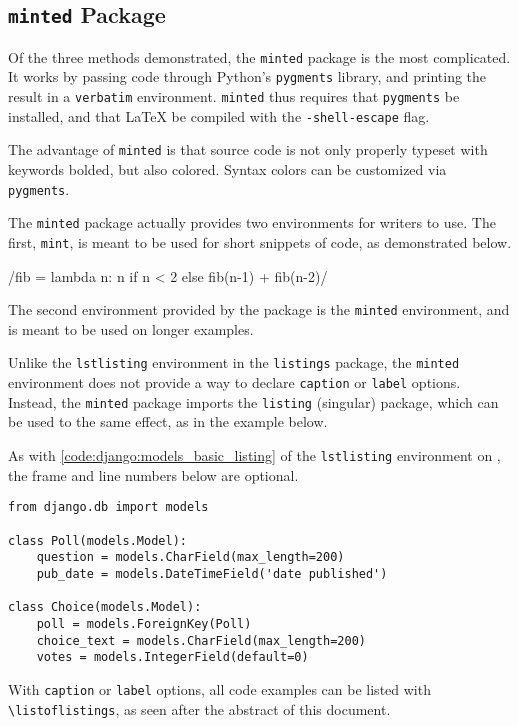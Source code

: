 
\subsection{\texttt{minted} Package}

Of the three methods demonstrated, the \verb|minted| package is the most complicated. It works by passing code through Python's \verb|pygments| library, and printing the result in a \verb|verbatim| environment. \verb|minted| thus requires that \verb|pygments| be installed, and that \LaTeX{} be compiled with the \verb|-shell-escape| flag.

The advantage of \verb|minted| is that source code is not only properly typeset with keywords bolded, but also colored. Syntax colors can be customized via \verb|pygments|.

The \verb|minted| package actually provides two environments for writers to use. The first, \verb|mint|, is meant to be used for short snippets of code, as demonstrated below.

/fib = lambda n: n if n < 2 else fib(n-1) + fib(n-2)/

The second environment provided by the package is the \verb|minted| environment, and is meant to be used on longer examples.

Unlike the \verb|lstlisting| environment in the \verb|listings| package, the \verb|minted| environment does not provide a way to declare \verb|caption| or \verb|label| options. Instead, the \verb|minted| package imports the \verb|listing| (singular) package, which can be used to the same effect, as in the example below.

As with \autoref{code:django:models_basic_listing} of the \verb|lstlisting| environment on , the frame and line numbers below are optional.

\begin{listing}[H]
\begin{verbatim}
from django.db import models

class Poll(models.Model):
    question = models.CharField(max_length=200)
    pub_date = models.DateTimeField('date published')

class Choice(models.Model):
    poll = models.ForeignKey(Poll)
    choice_text = models.CharField(max_length=200)
    votes = models.IntegerField(default=0)
\end{verbatim}
\cprotect\caption[Minted Example]{\verb|models.py| from Django Tutorial using Minted}
\label{code:django:models_basic_minted}
\end{listing}

With \verb|caption| or \verb|label| options, all code examples can be listed with \verb|\listoflistings|, as seen after the abstract of this document.